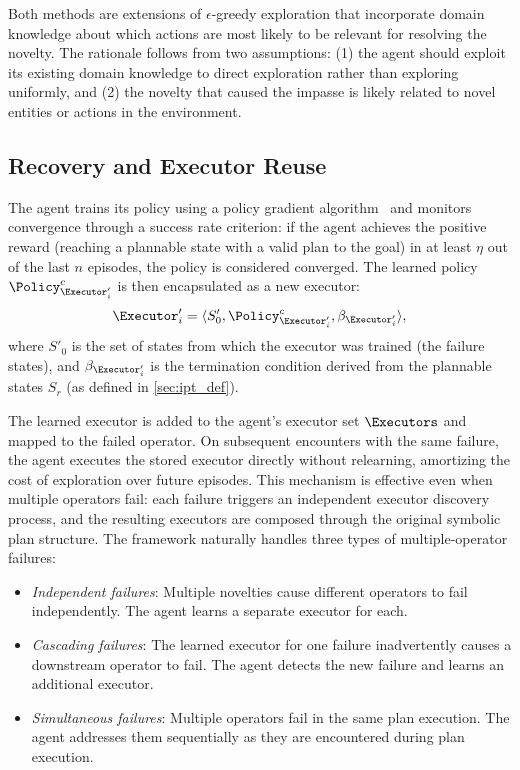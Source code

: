 Both methods are extensions of $\epsilon$-greedy exploration that incorporate domain knowledge about which actions are most likely to be relevant for resolving the novelty. The rationale follows from two assumptions: (1) the agent should exploit its existing domain knowledge to direct exploration rather than exploring uniformly, and (2) the novelty that caused the impasse is likely related to novel entities or actions in the environment.

\subsection{Recovery and Executor Reuse}
\label{sec:recovery}

The agent trains its policy using a policy gradient algorithm~\citep{williams1992reinforce} and monitors convergence through a success rate criterion: if the agent achieves the positive reward (reaching a plannable state with a valid plan to the goal) in at least $\eta$ out of the last $n$ episodes, the policy is considered converged. The learned policy $\Policy^c_{\Executor'_i}$ is then encapsulated as a new executor:
\[
\Executor'_i = \langle S'_0, \Policy^c_{\Executor'_i}, \beta_{\Executor'_i} \rangle,
\]
where $S'_0$ is the set of states from which the executor was trained (the failure states), and $\beta_{\Executor'_i}$ is the termination condition derived from the plannable states $S_r$ (as defined in \cref{sec:ipt_def}).

The learned executor is added to the agent's executor set $\Executors$ and mapped to the failed operator. On subsequent encounters with the same failure, the agent executes the stored executor directly without relearning, amortizing the cost of exploration over future episodes. This mechanism is effective even when multiple operators fail: each failure triggers an independent executor discovery process, and the resulting executors are composed through the original symbolic plan structure. The framework naturally handles three types of multiple-operator failures:
\begin{itemize}[leftmargin=*]
    \item \emph{Independent failures}: Multiple novelties cause different operators to fail independently. The agent learns a separate executor for each.
    \item \emph{Cascading failures}: The learned executor for one failure inadvertently causes a downstream operator to fail. The agent detects the new failure and learns an additional executor.
    \item \emph{Simultaneous failures}: Multiple operators fail in the same plan execution. The agent addresses them sequentially as they are encountered during plan execution.
\end{itemize}

